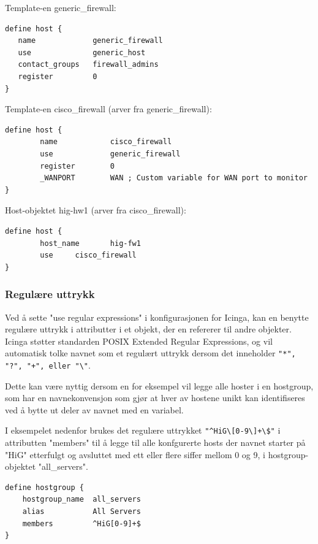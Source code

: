 Template-en generic\_firewall:

\begin{lstlisting}[style=example]
define host {
   name             generic_firewall
   use              generic_host
   contact_groups   firewall_admins
   register         0
}
\end{lstlisting}

Template-en cisco\_firewall (arver fra generic\_firewall):

\begin{lstlisting}[style=example]
define host {
        name            cisco_firewall
        use             generic_firewall
        register        0
        _WANPORT        WAN ; Custom variable for WAN port to monitor
}
\end{lstlisting}

Host-objektet hig-hw1 (arver fra cisco\_firewall):

\begin{lstlisting}[style=example]
define host {
        host_name       hig-fw1
        use		cisco_firewall
}
\end{lstlisting}

\subsubsection{Regulære uttrykk}
Ved å sette "use regular expressions" i konfigurasjonen for Icinga, kan en benytte regulære uttrykk i attributter i et objekt, der en refererer til andre objekter. Icinga støtter standarden POSIX Extended Regular Expressions, og vil automatisk tolke navnet som et regulært uttrykk dersom det inneholder \verb|"*", "?", "+", eller "\"|.

Dette kan være nyttig dersom en for eksempel vil legge alle hoster i en hostgroup, som har en navnekonvensjon som gjør at hver av hostene unikt kan identifiseres ved å bytte ut deler av navnet med en variabel.

I eksempelet nedenfor brukes det regulære uttrykket \verb|"^HiG\[0-9\]+\$"| i attributten "members" til å legge til alle konfgurerte hosts der navnet starter på "HiG" etterfulgt og avsluttet med ett eller flere siffer mellom 0 og 9, i hostgroup-objektet "all\_servers".

\begin{lstlisting}[style=example]
define hostgroup {
	hostgroup_name	all_servers
	alias           All Servers
	members         ^HiG[0-9]+$
}
\end{lstlisting}

